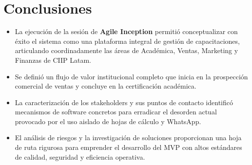 \documentclass[11pt,a4paper]{article}
\begin{document}
\section{Conclusiones}
\begin{itemize}
    \item La ejecución de la sesión de \textbf{Agile Inception} permitió conceptualizar con éxito el sistema como una plataforma integral de gestión de capacitaciones, articulando coordinadamente las áreas de Académica, Ventas, Marketing y Finanzas de CIIP Latam.
    \item Se definió un flujo de valor institucional completo que inicia en la prospección comercial de ventas y concluye en la certificación académica.
    \item La caracterización de los stakeholders y sus puntos de contacto identificó mecanismos de software concretos para erradicar el desorden actual provocado por el uso aislado de hojas de cálculo y WhatsApp.
    \item El análisis de riesgos y la investigación de soluciones proporcionan una hoja de ruta rigurosa para emprender el desarrollo del MVP con altos estándares de calidad, seguridad y eficiencia operativa.
\end{itemize}
\end{document}
